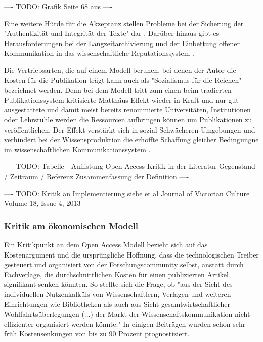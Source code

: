 ---- TODO: Grafik Seite 68 aus \cite{EuropeanCommission_sciencepub_2006} ----

Eine weitere Hürde für die Akzeptanz stellen Probleme bei der Sicherung der "Authentizität und Integrität der Texte" dar \cite{weishaupt_2009_goldenOA}. Darüber hinaus gibt es Herausforderungen bei der Langzeitarchivierung und der Einbettung offener Kommunikation in das wissenschaftliche Reputationssystem \cite{weishaupt_2009_goldenOA} \cite{Suber_2002} \cite{Adema_2014_open_access}.

Die Vertriebsarten, die auf einem Modell beruhen, bei denen der Autor die Kosten für die Publikation trägt kann auch als "Sozialismus für die Reichen" \cite{cope2014future} bezeichnet werden. Denn bei dem Modell tritt zum einen beim tradierten Publikationssystem kritisierte Matthäus-Effekt wieder in Kraft und nur gut ausgestattete und damit meist bereits renommierte Universitäten, Institutionen oder Lehrsrühle werden die Ressourcen aufbringen können um Publikationen zu veröffentlichen. Der Effekt verstärkt sich in sozial Schwächeren Umgebungen und verhindert bei der Wissensproduktion die erhoffte Schaffung gleicher Bedingungne im wissenschaftlichen Kommunikationssystem \cite{suchen}.

---- TODO: Tabelle - Auflistung Open Access Kritik in der Literatur
Gegenstand / Zeitraum / Referenz Zusammenfassung der Definition ----

---- TODO: Kritik an Implementierung siehe \cite{Mussell_2013} et al Journal of Victorian Culture
Volume 18, Issue 4, 2013  ----

\subsubsection{Kritik am ökonomischen Modell}

Ein Kritikpunkt an dem Open Access Modell bezieht sich auf das Kostenargument und die ursprüngliche Hoffnung, dass die technologischen Treiber gesteuert und organisiert von der Forschungscommunity selbst, anstatt durch Fachverlage, die durchschnittlichen Kosten für einen publizierten Artikel signifikant senken könnten. So stellte sich die Frage, ob "aus der Sicht des individuellen Nutzenkalküls von Wissenschaftlern, Verlagen und weiteren Einrichtungen wie Bibliotheken als auch aus Sicht gesamtwirtschaftlicher Wohlfahrtsüberlegungen (...) der Markt der Wissenschaftskommunikation nicht effizienter organisiert werden könnte."\cite{Hess_2006} In einigen Beiträgen wurden schon sehr früh Kostensenkungen von bis zu 90 Prozent \cite{hilf_2004} \cite{suchen} prognostiziert.


